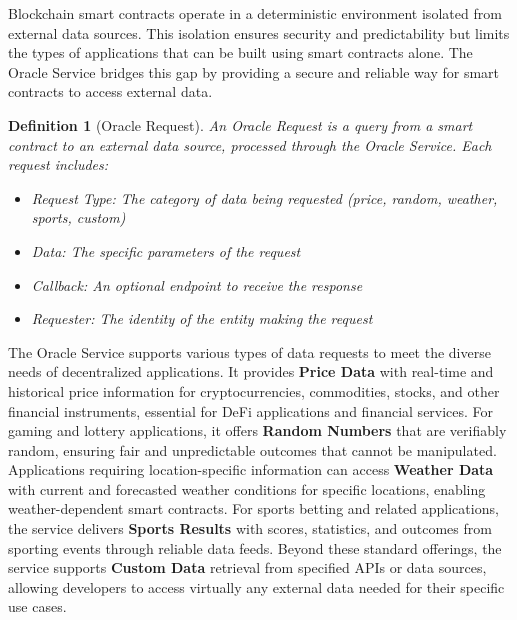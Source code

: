 \documentclass{article}
\newtheorem{definition}{Definition}
\begin{document}
Blockchain smart contracts operate in a deterministic environment isolated from external data sources. This isolation ensures security and predictability but limits the types of applications that can be built using smart contracts alone. The Oracle Service bridges this gap by providing a secure and reliable way for smart contracts to access external data.



\begin{definition}[Oracle Request]
An Oracle Request is a query from a smart contract to an external data source, processed through the Oracle Service. Each request includes:
\begin{itemize}
    \item Request Type: The category of data being requested (price, random, weather, sports, custom)
    \item Data: The specific parameters of the request
    \item Callback: An optional endpoint to receive the response
    \item Requester: The identity of the entity making the request
\end{itemize}
\end{definition}

The Oracle Service supports various types of data requests to meet the diverse needs of decentralized applications. It provides \textbf{Price Data} with real-time and historical price information for cryptocurrencies, commodities, stocks, and other financial instruments, essential for DeFi applications and financial services. For gaming and lottery applications, it offers \textbf{Random Numbers} that are verifiably random, ensuring fair and unpredictable outcomes that cannot be manipulated. Applications requiring location-specific information can access \textbf{Weather Data} with current and forecasted weather conditions for specific locations, enabling weather-dependent smart contracts. For sports betting and related applications, the service delivers \textbf{Sports Results} with scores, statistics, and outcomes from sporting events through reliable data feeds. Beyond these standard offerings, the service supports \textbf{Custom Data} retrieval from specified APIs or data sources, allowing developers to access virtually any external data needed for their specific use cases.
\end{document}
